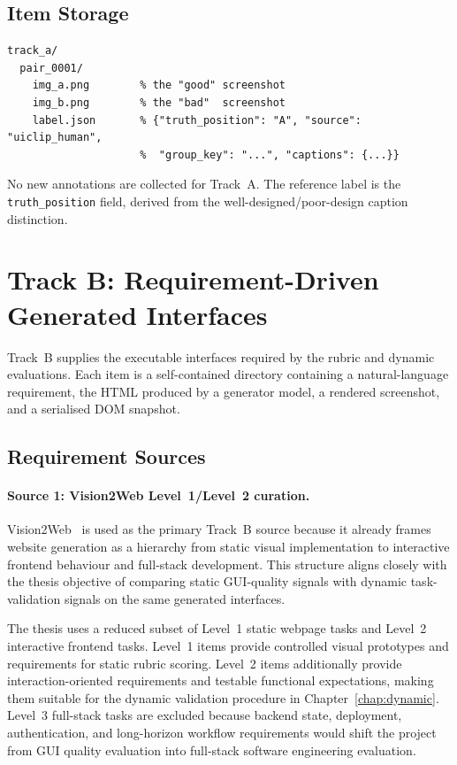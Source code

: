 \subsection{Item Storage}

\begin{lstlisting}[basicstyle=\ttfamily\small]
track_a/
  pair_0001/
    img_a.png        % the "good" screenshot
    img_b.png        % the "bad"  screenshot
    label.json       % {"truth_position": "A", "source": "uiclip_human",
                     %  "group_key": "...", "captions": {...}}
\end{lstlisting}

No new annotations are collected for Track~A. The reference label is
the \texttt{truth\_position} field, derived from the
well-designed/poor-design caption distinction.

\section{Track B: Requirement-Driven Generated Interfaces}
\label{sec:track-b-construction}

Track~B supplies the executable interfaces required by the rubric and
dynamic evaluations. Each item is a self-contained directory containing
a natural-language requirement, the HTML produced by a generator model,
a rendered screenshot, and a serialised DOM snapshot.

\subsection{Requirement Sources}

\paragraph{Source 1: Vision2Web Level~1/Level~2 curation.}
Vision2Web~\cite{vision2web} is used as the primary Track~B source
because it already frames website generation as a hierarchy from static
visual implementation to interactive frontend behaviour and full-stack
development. This structure aligns closely with the thesis objective of
comparing static GUI-quality signals with dynamic task-validation
signals on the same generated interfaces.

The thesis uses a reduced subset of Level~1 static webpage tasks and
Level~2 interactive frontend tasks. Level~1 items provide controlled
visual prototypes and requirements for static rubric scoring. Level~2
items additionally provide interaction-oriented requirements and
testable functional expectations, making them suitable for the dynamic
validation procedure in Chapter~\ref{chap:dynamic}. Level~3 full-stack
tasks are excluded because backend state, deployment, authentication,
and long-horizon workflow requirements would shift the project from GUI
quality evaluation into full-stack software engineering evaluation.


